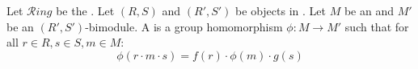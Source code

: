 \begin{definition} \label{definition:morphism_between_bimodules_of_different_rings_over_a_morphism_of_the_rings}
Let $\mathcal{R}ing$ be the . Let $(R, S)$ and $(R', S')$ be objects in . Let $M$ be an  and $M'$ be an $(R', S')$-bimodule. 
A  is a group homomorphism $\phi: M \to M'$ such that for all $r \in R, s \in S, m \in M$:
$$\phi(r \cdot m \cdot s) = f(r) \cdot \phi(m) \cdot g(s)$$
\end{definition}